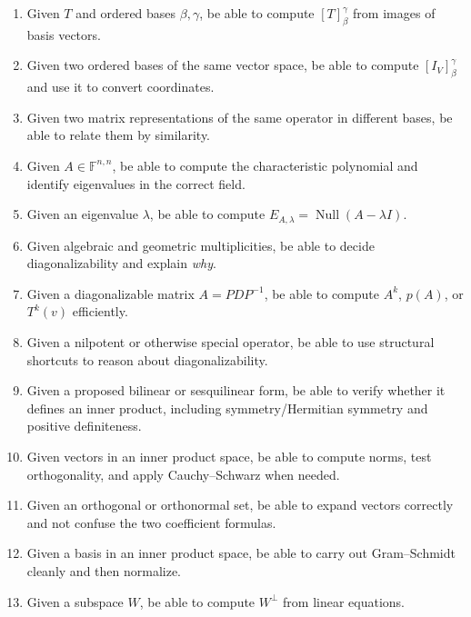\begin{examtip}[title={Final Revision Checklist: ``Given \(\cdots\), be able to \(\cdots\)''}]
\begin{enumerate}[leftmargin=*]
    \item Given \(T\) and ordered bases \(\beta,\gamma\), be able to compute \([T]^\gamma_\beta\) from images of basis vectors.

    \item Given two ordered bases of the same vector space, be able to compute \([I_V]^\gamma_\beta\) and use it to convert coordinates.

    \item Given two matrix representations of the same operator in different bases, be able to relate them by similarity.

    \item Given \(A\in\mathbb{F}^{n,n}\), be able to compute the characteristic polynomial and identify eigenvalues in the correct field.

    \item Given an eigenvalue \(\lambda\), be able to compute \(E_{A,\lambda}=\operatorname{Null}(A-\lambda I)\).

    \item Given algebraic and geometric multiplicities, be able to decide diagonalizability and explain \emph{why}.

    \item Given a diagonalizable matrix \(A=PDP^{-1}\), be able to compute \(A^k\), \(p(A)\), or \(T^k(v)\) efficiently.

    \item Given a nilpotent or otherwise special operator, be able to use structural shortcuts to reason about diagonalizability.

    \item Given a proposed bilinear or sesquilinear form, be able to verify whether it defines an inner product, including symmetry/Hermitian symmetry and positive definiteness.

    \item Given vectors in an inner product space, be able to compute norms, test orthogonality, and apply Cauchy--Schwarz when needed.

    \item Given an orthogonal or orthonormal set, be able to expand vectors correctly and not confuse the two coefficient formulas.

    \item Given a basis in an inner product space, be able to carry out Gram--Schmidt cleanly and then normalize.

    \item Given a subspace \(W\), be able to compute \(W^\perp\) from linear equations.


\end{enumerate}
\end{examtip}
